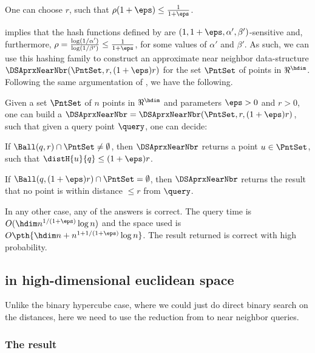 \begin{lemma}
    One can choose $r$, such that $\rho(1+\eps) \leq
    \frac{1}{1+\eps}$. 
\end{lemma}

 implies that the hash functions defined by
 are $(1,1+\eps,\alpha', \beta')$-sensitive and,
furthermore, $\rho = \frac{\log (1/\alpha')}{\log (1/\beta')} \leq
\frac{1}{1+\eps}$, for some values of $\alpha'$ and $\beta'$. As such,
we can use this hashing family to construct an approximate near
neighbor data-structure $\DSAprxNearNbr(\PntSet,r,(1+\eps)r)$ for the
set $\PntSet$ of points in $\Re^\hdim$. Following the same
argumentation of , we have the
following.

\begin{theorem}
    Given a set $\PntSet$ of $n$ points in $\Re^\hdim$ and parameters
    $\eps>0$ and $r > 0$, one can build a $\DSAprxNearNbr =
    \DSAprxNearNbr(\PntSet,r,(1+\eps)r)$, such that given a query
    point $\query$, one can decide:
    \begin{compactenumA}
        \item If $\Ball(q, r) \cap \PntSet \ne \emptyset$, then
        $\DSAprxNearNbr$ returns a point $u \in \PntSet$, such that
        $\distH{u}{q} \leq (1+\eps)r$.

        \item If $\Ball(q, (1+\eps)r) \cap \PntSet = \emptyset$, then
        $\DSAprxNearNbr$ returns the result that no point is within
        distance $\leq r$ from $\query$.
    \end{compactenumA}
    In any other case, any of the answers is correct. The query time
    is $O( \hdim n^{1/(1+\eps)} \log n)$ and the space used is
    $O\pth{\hdim n + n^{1 + 1/(1+\eps)} \log n }$. The result returned
    is correct with high probability.
\end{theorem}

\subsection{\ANNbr in high-dimensional euclidean space}

Unlike the binary hypercube case, where we could just do direct binary
search on the distances, here we need to use the reduction from \ANNbr
to near neighbor queries.

\subsubsection{The result}

